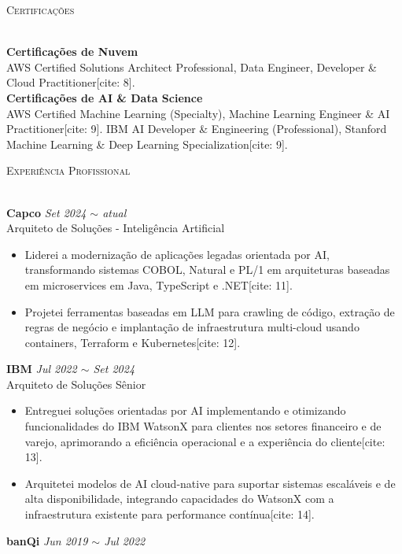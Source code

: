 \documentclass[a4paper]{article}
\newcommand{\lineunder} {
    \vspace*{-8pt} \\
    \hspace*{-18pt} \hrulefill \\
}
\newcommand{\header} [1] {
    \vspace{2mm}
    {\hspace*{-18pt}\vspace*{7pt} \textsc{#1}}
    \vspace*{-6pt} \lineunder
    \vspace{1mm}
}
\begin{document}
\header{Certificações}
\textbf{Certificações de Nuvem} \\
AWS Certified Solutions Architect Professional, Data Engineer, Developer \& Cloud Practitioner[cite: 8]. 
\\
\vspace{0.5mm}
\textbf{Certificações de AI \& Data Science} \\
AWS Certified Machine Learning (Specialty), Machine Learning Engineer \& AI Practitioner[cite: 9]. 
IBM AI Developer \& Engineering (Professional), Stanford Machine Learning \& Deep Learning Specialization[cite: 9]. 
\header{Experiência Profissional}
\textbf{Capco} \hfill \textit{Set 2024 $\sim$ atual} \\
Arquiteto de Soluções - Inteligência Artificial \\
\vspace{-2mm}
\begin{itemize}
\setlength\itemsep{-1mm}
    \item Liderei a modernização de aplicações legadas orientada por AI, transformando sistemas COBOL, Natural e PL/1 em arquiteturas baseadas em microservices em Java, TypeScript e .NET[cite: 11]. 
\item Projetei ferramentas baseadas em LLM para crawling de código, extração de regras de negócio e implantação de infraestrutura multi-cloud usando containers, Terraform e Kubernetes[cite: 12]. 
\end{itemize}
\vspace{-1mm}
\textbf{IBM} \hfill \textit{Jul 2022 $\sim$ Set 2024} \\
Arquiteto de Soluções Sênior \\
\vspace{-2mm}
\begin{itemize}
\setlength\itemsep{-1mm}
    \item Entreguei soluções orientadas por AI implementando e otimizando funcionalidades do IBM WatsonX para clientes nos setores financeiro e de varejo, aprimorando a eficiência operacional e a experiência do cliente[cite: 13]. 
\item Arquitetei modelos de AI cloud-native para suportar sistemas escaláveis e de alta disponibilidade, integrando capacidades do WatsonX com a infraestrutura existente para performance contínua[cite: 14]. 
\end{itemize}
\vspace{-1mm}
\textbf{banQi} \hfill \textit{Jun 2019 $\sim$ Jul 2022} \\
\end{document}
